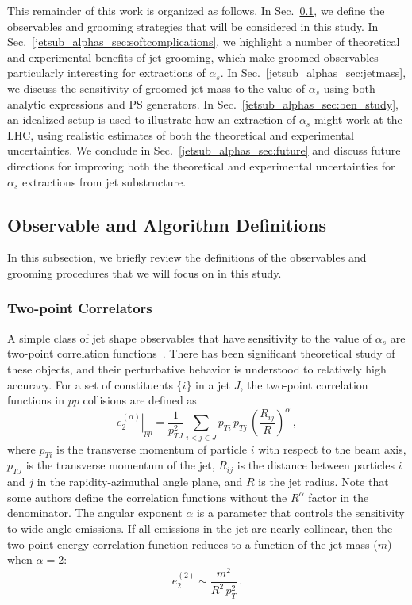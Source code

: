 \documentclass[11pt]{cernrep}
\begin{document}
This remainder of this work is organized as follows.
%
In Sec.~\ref{jetsub_alphas_sec:definitions}, we define the observables and grooming strategies that will be considered in this study.
%
In Sec.~\ref{jetsub_alphas_sec:softcomplications}, we highlight a number of theoretical and experimental benefits of jet grooming, which make groomed observables particularly interesting for extractions of $\alpha_s$.
%
In Sec.~\ref{jetsub_alphas_sec:jetmass}, we discuss the sensitivity of groomed jet mass to the value of $\alpha_s$ using both analytic expressions and PS generators.
%
In Sec.~\ref{jetsub_alphas_sec:ben_study}, an idealized setup is used to illustrate how an extraction of $\alpha_s$ might work at the LHC, using realistic estimates of both the theoretical and experimental uncertainties.
%
We conclude in Sec.~\ref{jetsub_alphas_sec:future} and discuss future directions for improving both the theoretical and experimental uncertainties for $\alpha_s$ extractions from jet substructure.

\subsection{Observable and Algorithm Definitions}
\label{jetsub_alphas_sec:definitions}

In this subsection, we briefly review the definitions of the observables and grooming procedures that we will focus on in this study.

\subsubsection{Two-point Correlators}\label{jetsub_alphas_sec:shape_def}

A simple class of jet shape observables that have sensitivity to the value of $\alpha_s$ are two-point correlation functions~\cite{Banfi:2004yd,Larkoski:2013eya}.
%
There has been significant theoretical study of these objects, and their perturbative behavior is understood to relatively high accuracy.
%
For a set of constituents $\{i\}$ in a jet $J$, the two-point correlation functions in $pp$ collisions are defined as
%
\begin{equation}
\label{jetsub_alphas_eq:ppe2}
\left.e_2^{(\alpha)}\right|_{pp}=\frac{1}{p_{TJ}^2}\sum_{i<j\in J} p_{Ti} \, p_{Tj} \, \left(\frac{R_{ij}}{R}\right)^\alpha\,, 
\end{equation}
where $p_{Ti}$ is the transverse momentum of particle $i$ with respect to the beam axis, $p_{TJ}$ is the transverse momentum of the jet, $R_{ij}$ is the distance between particles $i$ and $j$ in the rapidity-azimuthal angle plane, and $R$ is the jet radius.
%
Note that some authors define the correlation functions without the $R^\alpha$ factor in the denominator.
%
The angular exponent $\alpha$ is a parameter that controls the sensitivity to wide-angle emissions.
%
If all emissions in the jet are nearly collinear, then the two-point energy correlation function reduces to a function of the jet mass ($m$) when $\alpha=2$:
\begin{equation}
e_2^{(2)}\sim \frac{m^2}{R^2\, p_{T}^2}\,.
\end{equation} 
\end{document}
